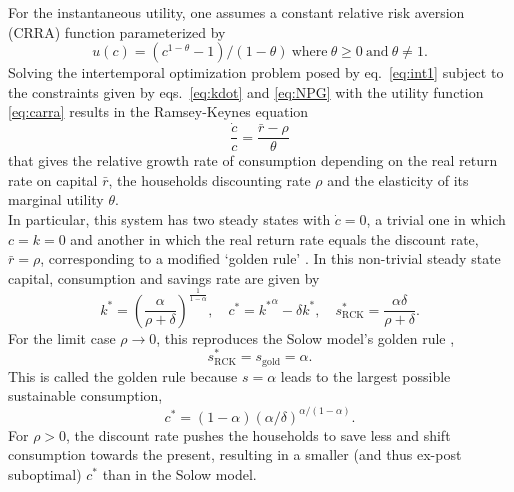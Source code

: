 For the instantaneous utility, one assumes a constant relative risk aversion (CRRA) function parameterized by
\begin{equation}
  u(c) = (c^{1-\theta} -1)/(1-\theta)~\mathrm{where}~\theta \geq0~\mathrm{and}~ \theta \neq 1.
  \label{eq:carra}
\end{equation}
Solving the intertemporal optimization problem posed by eq.~\eqref{eq:int1} subject to the constraints given by eqs.~\eqref{eq:kdot} and \eqref{eq:NPG} with the utility function \eqref{eq:carra} results in the Ramsey-Keynes equation
\begin{equation}
  \frac{\dot{c}}{c} = \frac{\bar{r} - \rho}{\theta}
  \label{eq:ramsey_keynes}
\end{equation}
that gives the relative growth rate of consumption depending on the real return rate on capital $\bar{r}$, the households discounting rate $\rho$ and the elasticity of its marginal utility $\theta$.\\

In particular, this system has two steady states with $\dot c\!=\!0$, a trivial one in which $c\!=\!k\!=\!0$ and another in which 
the real return rate equals the discount rate, $\bar r \!=\! \rho$, corresponding to a modified `golden rule' \citep[p. 300]{Acemoglu2009}. In this non-trivial steady state capital, consumption and savings rate are given by
\begin{equation}
	k^\ast = \left(\frac{\alpha}{\rho + \delta}\right)^{\frac{1}{1-\alpha}}, 
 	\quad c^\ast = {k^\ast}^{\alpha} -  \delta k^\ast,
 	\quad s^\ast_\mathrm{RCK} = \frac{\alpha \delta}{\rho + \delta}. \label{eq:rck_steady_state}
\end{equation}
For the limit case $\rho\to 0$, this reproduces the Solow model's golden rule \citep[p. 35]{Barro2004}, 
\begin{equation}
  s^\ast_\mathrm{RCK} \! =s_\mathrm{gold} \!=\! \alpha.
  \label{eq:golden_rule}
\end{equation}
This is called the golden rule because $s = \alpha$ leads to the largest possible sustainable consumption,
\begin{equation}
        c^\ast \! =\!(1\! -\! \alpha)(\alpha/\delta)^{\alpha/(1-\alpha)}.
        \label{eq:golden_rule_consumption}
\end{equation}
For $\rho \! > \!0$, the discount rate pushes the households to save less and shift consumption towards the present, resulting in a smaller (and thus ex-post suboptimal) $c^\ast$ than in the Solow model.

